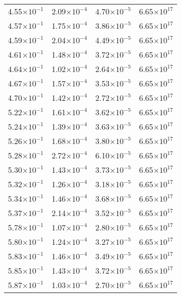 \documentclass{aa}
\begin{document}
{\begin{longtable}{c|c|c|c}
4.55$\times 10^{-1}$ & 2.09$\times 10^{-4}$ & 4.70$\times 10^{-5}$ & 6.65$\times 10^{17}$  \\
4.57$\times 10^{-1}$ & 1.75$\times 10^{-4}$ & 3.86$\times 10^{-5}$ & 6.65$\times 10^{17}$  \\
4.59$\times 10^{-1}$ & 2.04$\times 10^{-4}$ & 4.49$\times 10^{-5}$ & 6.65$\times 10^{17}$  \\
4.61$\times 10^{-1}$ & 1.48$\times 10^{-4}$ & 3.72$\times 10^{-5}$ & 6.65$\times 10^{17}$  \\
4.64$\times 10^{-1}$ & 1.02$\times 10^{-4}$ & 2.64$\times 10^{-5}$ & 6.65$\times 10^{17}$  \\
4.67$\times 10^{-1}$ & 1.57$\times 10^{-4}$ & 3.53$\times 10^{-5}$ & 6.65$\times 10^{17}$  \\
4.70$\times 10^{-1}$ & 1.42$\times 10^{-4}$ & 2.72$\times 10^{-5}$ & 6.65$\times 10^{17}$  \\
5.22$\times 10^{-1}$ & 1.61$\times 10^{-4}$ & 3.62$\times 10^{-5}$ & 6.65$\times 10^{17}$  \\
5.24$\times 10^{-1}$ & 1.39$\times 10^{-4}$ & 3.63$\times 10^{-5}$ & 6.65$\times 10^{17}$  \\
5.26$\times 10^{-1}$ & 1.68$\times 10^{-4}$ & 3.80$\times 10^{-5}$ & 6.65$\times 10^{17}$  \\
5.28$\times 10^{-1}$ & 2.72$\times 10^{-4}$ & 6.10$\times 10^{-5}$ & 6.65$\times 10^{17}$  \\
5.30$\times 10^{-1}$ & 1.43$\times 10^{-4}$ & 3.73$\times 10^{-5}$ & 6.65$\times 10^{17}$  \\
5.32$\times 10^{-1}$ & 1.26$\times 10^{-4}$ & 3.18$\times 10^{-5}$ & 6.65$\times 10^{17}$  \\
5.34$\times 10^{-1}$ & 1.46$\times 10^{-4}$ & 3.68$\times 10^{-5}$ & 6.65$\times 10^{17}$  \\
5.37$\times 10^{-1}$ & 2.14$\times 10^{-4}$ & 3.52$\times 10^{-5}$ & 6.65$\times 10^{17}$  \\
5.78$\times 10^{-1}$ & 1.07$\times 10^{-4}$ & 2.80$\times 10^{-5}$ & 6.65$\times 10^{17}$  \\
5.80$\times 10^{-1}$ & 1.24$\times 10^{-4}$ & 3.27$\times 10^{-5}$ & 6.65$\times 10^{17}$  \\
5.83$\times 10^{-1}$ & 1.46$\times 10^{-4}$ & 3.49$\times 10^{-5}$ & 6.65$\times 10^{17}$  \\
5.85$\times 10^{-1}$ & 1.43$\times 10^{-4}$ & 3.72$\times 10^{-5}$ & 6.65$\times 10^{17}$  \\
5.87$\times 10^{-1}$ & 1.03$\times 10^{-4}$ & 2.70$\times 10^{-5}$ & 6.65$\times 10^{17}$  \\

\end{longtable}}
\end{document}
